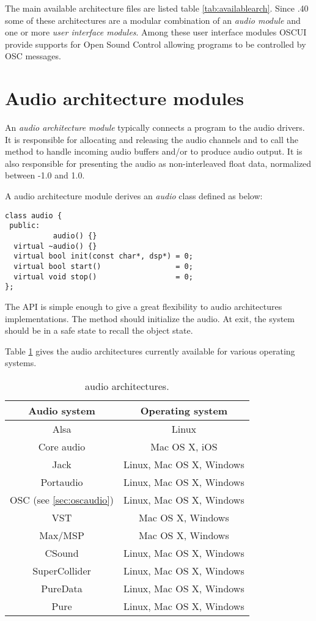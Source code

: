 The main available architecture files are listed table \ref{tab:availablearch}. Since .40 some of these architectures are a modular combination of an \emph{audio module} and one or more \emph{user interface modules}. Among these user interface modules OSCUI provide supports for Open Sound Control allowing \faust programs to be controlled by OSC messages. 

\section{Audio architecture modules} 
An \emph{audio architecture module} typically connects a \faust program to the audio drivers.
It is responsible for allocating and releasing the audio channels and to call the \faust {} method to handle incoming audio buffers and/or to produce audio output. It is also responsible for presenting the audio as non-interleaved float data, normalized between -1.0 and 1.0.

A \faust audio architecture module derives an \emph{audio} class defined as below:
\begin{lstlisting}[basicstyle=\ttfamily\footnotesize\color{yotxt}]
class audio {
 public:
           audio() {}
  virtual ~audio() {}
  virtual bool init(const char*, dsp*) = 0;
  virtual bool start()                 = 0;
  virtual void stop()                  = 0;
};
\end{lstlisting} 


The API is simple enough to give a great flexibility to audio architectures implementations. The  method should initialize the audio. At  exit, the system should be in a safe state to recall the  object state.

Table \ref{tab:aarch} gives the audio architectures currently available for various operating systems.
\begin{table}[htdp]
\begin{center}
\begin{tabular}{|c|c|}
\hline
\bf{Audio system} & \bf{Operating system} \\
\hline
Alsa  & Linux \\
Core audio 		& Mac OS X, iOS \\
Jack 				& Linux, Mac OS X, Windows \\
Portaudio 			& Linux, Mac OS X, Windows \\
OSC {\footnotesize (see \ref{sec:oscaudio})} & Linux, Mac OS X, Windows \\
VST					& Mac OS X, Windows \\
Max/MSP				& Mac OS X, Windows \\
CSound				& Linux, Mac OS X, Windows \\
SuperCollider		& Linux, Mac OS X, Windows \\
PureData			& Linux, Mac OS X, Windows \\
Pure \cite{graef09}				& Linux, Mac OS X, Windows \\
\hline
\end{tabular}
\end{center}
\caption{\faust audio architectures.}
\label{tab:aarch}
\end{table}%
 

